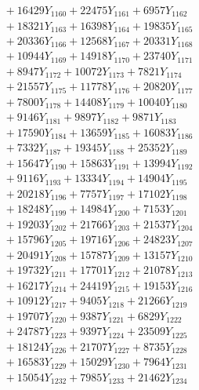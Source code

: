 \documentclass[a4paper,10pt]{article}
\begin{document}
{\begin{align}
&\;  + 16429 Y_{1160} + 22475 Y_{1161} + 6957 Y_{1162} \\[0.3ex]
&\;  + 18321 Y_{1163} + 16398 Y_{1164} + 19835 Y_{1165} \\[0.3ex]
&\;  + 20336 Y_{1166} + 12568 Y_{1167} + 20331 Y_{1168} \\[0.5ex]\allowbreak
&\;  + 10944 Y_{1169} + 14918 Y_{1170} + 23740 Y_{1171} \\[0.3ex]
&\;  + 8947 Y_{1172} + 10072 Y_{1173} + 7821 Y_{1174} \\[0.3ex]
&\;  + 21557 Y_{1175} + 11778 Y_{1176} + 20820 Y_{1177} \\[0.3ex]
&\;  + 7800 Y_{1178} + 14408 Y_{1179} + 10040 Y_{1180} \\[0.3ex]
&\;  + 9146 Y_{1181} + 9897 Y_{1182} + 9871 Y_{1183} \\[0.3ex]
&\;  + 17590 Y_{1184} + 13659 Y_{1185} + 16083 Y_{1186} \\[0.3ex]
&\;  + 7332 Y_{1187} + 19345 Y_{1188} + 25352 Y_{1189} \\[0.3ex]
&\;  + 15647 Y_{1190} + 15863 Y_{1191} + 13994 Y_{1192} \\[0.3ex]
&\;  + 9116 Y_{1193} + 13334 Y_{1194} + 14904 Y_{1195} \\[0.3ex]
&\;  + 20218 Y_{1196} + 7757 Y_{1197} + 17102 Y_{1198} \\[0.5ex]\allowbreak
&\;  + 18248 Y_{1199} + 14984 Y_{1200} + 7153 Y_{1201} \\[0.3ex]
&\;  + 19203 Y_{1202} + 21766 Y_{1203} + 21537 Y_{1204} \\[0.3ex]
&\;  + 15796 Y_{1205} + 19716 Y_{1206} + 24823 Y_{1207} \\[0.3ex]
&\;  + 20491 Y_{1208} + 15787 Y_{1209} + 13157 Y_{1210} \\[0.3ex]
&\;  + 19732 Y_{1211} + 17701 Y_{1212} + 21078 Y_{1213} \\[0.3ex]
&\;  + 16217 Y_{1214} + 24419 Y_{1215} + 19153 Y_{1216} \\[0.3ex]
&\;  + 10912 Y_{1217} + 9405 Y_{1218} + 21266 Y_{1219} \\[0.3ex]
&\;  + 19707 Y_{1220} + 9387 Y_{1221} + 6829 Y_{1222} \\[0.3ex]
&\;  + 24787 Y_{1223} + 9397 Y_{1224} + 23509 Y_{1225} \\[0.3ex]
&\;  + 18124 Y_{1226} + 21707 Y_{1227} + 8735 Y_{1228} \\[0.5ex]\allowbreak
&\;  + 16583 Y_{1229} + 15029 Y_{1230} + 7964 Y_{1231} \\[0.3ex]
&\;  + 15054 Y_{1232} + 7985 Y_{1233} + 21462 Y_{1234} \\[0.3ex]

\end{align}}
\end{document}
